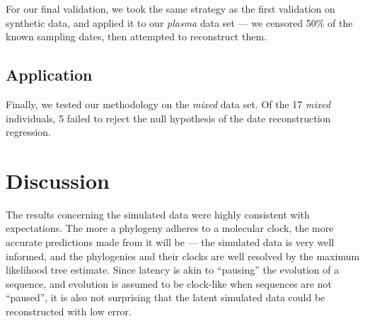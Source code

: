 \documentclass[12pt]{article}
\begin{document}
For our final validation, we took the same strategy as the first validation on synthetic data, and applied it to our {\em plasma} data set --- we censored 50\% of the known sampling dates, then attempted to reconstruct them.


\subsection * {Application} \label{sec:mixed_data}




Finally, we tested our methodology on the {\em mixed} data set. Of the 17 \emph{mixed} individuals, 5 failed to reject the null hypothesis of the date reconstruction regression.


\section * {Discussion} \label{sec:discuss}
The results concerning the simulated data were highly consistent with expectations. 
The more a phylogeny adheres to a molecular clock, the more accurate predictions made from it will be --- the simulated data is very well informed, and the phylogenies and their clocks are well resolved by the maximum likelihood tree estimate. 
Since latency is akin to ``pausing'' the evolution of a sequence, and evolution is assumed to be clock-like when sequences are not ``paused'', it is also not surprising that the latent simulated data could be reconstructed with low error. 
\end{document}
